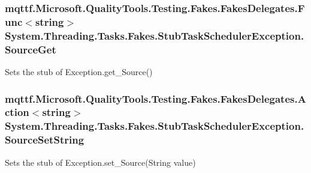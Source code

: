 \hypertarget{class_system_1_1_threading_1_1_tasks_1_1_fakes_1_1_stub_task_scheduler_exception_a9ebaad8db6c11e09c75be9c12adea178}{
\subsubsection[{Source\-Get}]{\setlength{\rightskip}{0pt plus 5cm}mqttf.\-Microsoft.\-Quality\-Tools.\-Testing.\-Fakes.\-Fakes\-Delegates.\-Func$<$string$>$ System.\-Threading.\-Tasks.\-Fakes.\-Stub\-Task\-Scheduler\-Exception.\-Source\-Get}}\label{class_system_1_1_threading_1_1_tasks_1_1_fakes_1_1_stub_task_scheduler_exception_a9ebaad8db6c11e09c75be9c12adea178}


Sets the stub of Exception.\-get\-\_\-\-Source()

\hypertarget{class_system_1_1_threading_1_1_tasks_1_1_fakes_1_1_stub_task_scheduler_exception_a33519d0f20a1503deb82edd8b57a77a1}{
\subsubsection[{Source\-Set\-String}]{\setlength{\rightskip}{0pt plus 5cm}mqttf.\-Microsoft.\-Quality\-Tools.\-Testing.\-Fakes.\-Fakes\-Delegates.\-Action$<$string$>$ System.\-Threading.\-Tasks.\-Fakes.\-Stub\-Task\-Scheduler\-Exception.\-Source\-Set\-String}}\label{class_system_1_1_threading_1_1_tasks_1_1_fakes_1_1_stub_task_scheduler_exception_a33519d0f20a1503deb82edd8b57a77a1}


Sets the stub of Exception.\-set\-\_\-\-Source(\-String value)

